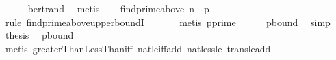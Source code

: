 \begin{isabellebody}
\ \ \ \ \isamarkupfalse%
\ bertrand\ \isamarkupfalse%
\ metis\isanewline
\ \ \isamarkupfalse%
\ {\isachardoublequoteopen}find{\isacharunderscore}{\kern0pt}prime{\isacharunderscore}{\kern0pt}above\ n\ {\isasymle}\ p{\isachardoublequoteclose}\isanewline
\ \ \ \ \isamarkupfalse%
\ {\isacharparenleft}{\kern0pt}rule\ find{\isacharunderscore}{\kern0pt}prime{\isacharunderscore}{\kern0pt}above{\isacharunderscore}{\kern0pt}upper{\isacharunderscore}{\kern0pt}boundI{\isacharparenright}{\kern0pt}\isanewline
\ \ \ \ \ \isamarkupfalse%
\ {\isacharparenleft}{\kern0pt}metis\ p{\isacharunderscore}{\kern0pt}prime{\isacharparenright}{\kern0pt}\isanewline
\ \ \ \ \isamarkupfalse%
\ p{\isacharunderscore}{\kern0pt}bound\ \isamarkupfalse%
\ simp\isanewline
\ \ \isamarkupfalse%
\ {\isacharquery}{\kern0pt}thesis\ \isamarkupfalse%
\ p{\isacharunderscore}{\kern0pt}bound\ \isanewline
\ \ \ \ \isamarkupfalse%
\ {\isacharparenleft}{\kern0pt}metis\ greaterThanLessThan{\isacharunderscore}{\kern0pt}iff\ nat{\isacharunderscore}{\kern0pt}le{\isacharunderscore}{\kern0pt}iff{\isacharunderscore}{\kern0pt}add\ nat{\isacharunderscore}{\kern0pt}less{\isacharunderscore}{\kern0pt}le\ trans{\isacharunderscore}{\kern0pt}le{\isacharunderscore}{\kern0pt}add{}{\isacharparenright}{\kern0pt}\isanewline
{}\isamarkupfalse%
%
\endisatagproof
{\isafoldproof}%
%
\isadelimproof
\isanewline
%
\endisadelimproof
%
\isadelimtheory
\isanewline
%
\endisadelimtheory
%
\isatagtheory
{}\isamarkupfalse%
%
\endisatagtheory
{\isafoldtheory}%
%
\isadelimtheory
%
\endisadelimtheory
%
\end{isabellebody}%
\endinput
